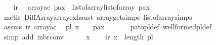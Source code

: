 \begin{isabellebody}
\ \ \isamarkupfalse%
\ ir\ \isamarkupfalse%
\ arrayac{\isacharcolon}{\kern0pt}\ {\isachardoublequoteopen}{\isacharparenleft}{\kern0pt}pa{\isacharbrackleft}{\kern0pt}{\isacharbrackleft}{\kern0pt}x{}{\isacharbrackright}{\kern0pt}{\isacharbrackright}{\kern0pt}{\isacharparenright}{\kern0pt}{\isacharbrackleft}{\kern0pt}{\isacharbrackleft}{\kern0pt}{}{\isacharbrackright}{\kern0pt}{\isacharbrackright}{\kern0pt}\ {\isacharequal}{\kern0pt}\ list{\isacharunderscore}{\kern0pt}of{\isacharunderscore}{\kern0pt}array{\isacharparenleft}{\kern0pt}{\isacharparenleft}{\kern0pt}list{\isacharunderscore}{\kern0pt}of{\isacharunderscore}{\kern0pt}array\ pa{\isacharparenright}{\kern0pt}{\isacharbang}{\kern0pt}x{}{\isacharparenright}{\kern0pt}{\isacharbang}{\kern0pt}{}{\isachardoublequoteclose}\isanewline
\ \ \ \ \isamarkupfalse%
\ {\isacharparenleft}{\kern0pt}metis\ Diff{\isacharunderscore}{\kern0pt}Array{\isachardot}{\kern0pt}array{\isachardot}{\kern0pt}exhaust\ array{\isacharunderscore}{\kern0pt}get{\isachardot}{\kern0pt}simps\ list{\isacharunderscore}{\kern0pt}of{\isacharunderscore}{\kern0pt}array{\isachardot}{\kern0pt}simps{\isacharparenright}{\kern0pt}\isanewline
\ \ \isamarkupfalse%
\ assms\ ir\ arrayac\ \isamarkupfalse%
\ {\isachardoublequoteopen}pl{\isacharbang}{\kern0pt}\ x{}\ {\isacharbang}{\kern0pt}\ {}\ {\isacharequal}{\kern0pt}\ {\isacharparenleft}{\kern0pt}pa{\isacharbrackleft}{\kern0pt}{\isacharbrackleft}{\kern0pt}x{}{\isacharbrackright}{\kern0pt}{\isacharbrackright}{\kern0pt}{\isacharparenright}{\kern0pt}{\isacharbrackleft}{\kern0pt}{\isacharbrackleft}{\kern0pt}{}{\isacharbrackright}{\kern0pt}{\isacharbrackright}{\kern0pt}{\isachardoublequoteclose}\ \isanewline
\ \ \ \ \isamarkupfalse%
\ pa{\isacharunderscore}{\kern0pt}to{\isacharunderscore}{\kern0pt}pl{\isacharunderscore}{\kern0pt}def\ well{\isacharunderscore}{\kern0pt}formed{\isacharunderscore}{\kern0pt}pl{\isacharunderscore}{\kern0pt}def\isanewline
\ \ \ \ \isamarkupfalse%
\ {\isacharparenleft}{\kern0pt}simp\ add{\isacharcolon}{\kern0pt}\ in{\isacharunderscore}{\kern0pt}br{\isacharunderscore}{\kern0pt}conv{\isacharparenright}{\kern0pt}\ \ \isanewline
{}\isamarkupfalse%
\isanewline
\ \ \isamarkupfalse%
\ x{}\isanewline
\ \ \isamarkupfalse%
\ ir{\isacharcolon}{\kern0pt}\ {\isachardoublequoteopen}x{}\ {\isacharless}{\kern0pt}\ length\ pl{\isachardoublequoteclose}\isanewline

\end{isabellebody}
